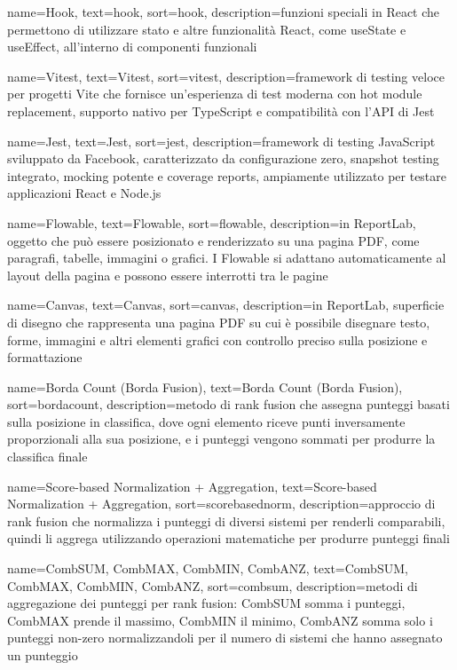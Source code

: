  {
    name=Hook,
    text=hook,
    sort=hook,
    description={funzioni speciali in React che permettono di utilizzare stato e altre funzionalità React, come useState e useEffect, all'interno di componenti funzionali}
}

 {
    name=Vitest,
    text=Vitest,
    sort=vitest,
    description={framework di testing veloce per progetti Vite che fornisce un'esperienza di test moderna con hot module replacement, supporto nativo per TypeScript e compatibilità con l'API di Jest}
}

 {
    name=Jest,
    text=Jest,
    sort=jest,
    description={framework di testing JavaScript sviluppato da Facebook, caratterizzato da configurazione zero, snapshot testing integrato, mocking potente e coverage reports, ampiamente utilizzato per testare applicazioni React e Node.js}
}

 {
    name=Flowable,
    text=Flowable,
    sort=flowable,
    description={in ReportLab, oggetto che può essere posizionato e renderizzato su una pagina PDF, come paragrafi, tabelle, immagini o grafici. I Flowable si adattano automaticamente al layout della pagina e possono essere interrotti tra le pagine}
}

 {
    name=Canvas,
    text=Canvas,
    sort=canvas,
    description={in ReportLab, superficie di disegno che rappresenta una pagina PDF su cui è possibile disegnare testo, forme, immagini e altri elementi grafici con controllo preciso sulla posizione e formattazione}
}

 {
    name=Borda Count (Borda Fusion),
    text=Borda Count (Borda Fusion),
    sort=bordacount,
    description={metodo di rank fusion che assegna punteggi basati sulla posizione in classifica, dove ogni elemento riceve punti inversamente proporzionali alla sua posizione, e i punteggi vengono sommati per produrre la classifica finale}
}

 {
    name=Score-based Normalization + Aggregation,
    text=Score-based Normalization + Aggregation,
    sort=scorebasednorm,
    description={approccio di rank fusion che normalizza i punteggi di diversi sistemi per renderli comparabili, quindi li aggrega utilizzando operazioni matematiche per produrre punteggi finali}
}

 {
    name={CombSUM, CombMAX, CombMIN, CombANZ},
    text={CombSUM, CombMAX, CombMIN, CombANZ},
    sort=combsum,
    description={metodi di aggregazione dei punteggi per rank fusion: CombSUM somma i punteggi, CombMAX prende il massimo, CombMIN il minimo, CombANZ somma solo i punteggi non-zero normalizzandoli per il numero di sistemi che hanno assegnato un punteggio}
}

